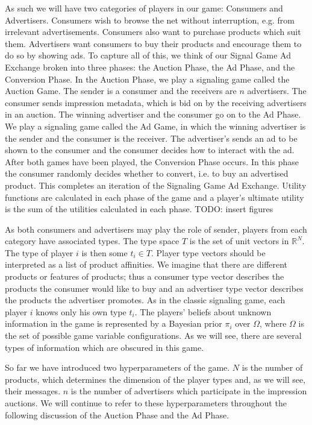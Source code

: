 \documentclass{article}
\begin{document}
As such we will have two categories of players in our game: Consumers and Advertisers. Consumers wish to browse the net without interruption, e.g. from irrelevant advertisements. Consumers also want to purchase products which suit them. Advertisers want consumers to buy their products and encourage them to do so by showing ads. To capture all of this, we think of our Signal Game Ad Exchange broken into three phases: the Auction Phase, the Ad Phase, and the Conversion Phase. In the Auction Phase, we play a signaling game called the Auction Game. The sender is a consumer and the receivers are $n$ advertisers. The consumer sends impression metadata, which is bid on by the receiving advertisers in an auction. The winning advertiser and the consumer go on to the Ad Phase. We play a signaling game called the Ad Game, in which the winning advertiser is the sender and the consumer is the receiver. The advertiser's sends an ad to be shown to the consumer and the consumer decides how to interact with the ad. After both games have been played, the Conversion Phase occurs. In this phase the consumer randomly decides whether to convert, i.e. to buy an advertised product. This completes an iteration of the Signaling Game Ad Exchange. Utility functions are calculated in each phase of the game and a player's ultimate utility is the sum of the utilities calculated in each phase. TODO: insert figures

As both consumers and advertisers may play the role of sender, players from each category have associated types. The type space $T$ is the set of unit vectors in $\mathbb{R}^N$. The type of player $i$ is then some $t_i \in T$. Player type vectors should be interpreted as a list of product affinities. We imagine that there are different products or features of products; thus a consumer type vector describes the products the consumer would like to buy and an advertiser type vector describes the products the advertiser promotes.  As in the classic signaling game, each player $i$ knows only his own type $t_i$. The players' beliefs about unknown information in the game is represented by a Bayesian prior $\pi_i$ over $\Omega$, where $\Omega$ is the set of possible game variable configurations. As we will see, there are several types of information which are obscured in this game.

So far we have introduced two hyperparameters of the game. $N$ is the number of products, which determines the dimension of the player types and, as we will see, their messages. $n$ is the number of advertisers which participate in the impression auctions. We will continue to refer to these hyperparameters throughout the following discussion of the Auction Phase and the Ad Phase. 
\end{document}

